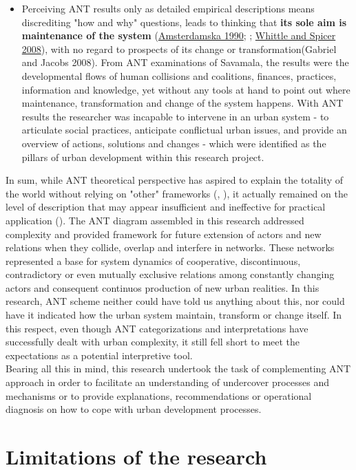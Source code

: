 \documentclass[11pt]{report}
\begin{document}
{\begin{itemize}
\item Perceiving ANT results only as detailed empirical descriptions means discrediting "how and why" questions, leads to thinking that \textbf{its sole aim is maintenance of the system} (\href{}{Amsterdamska 1990}; \cite{Lee and Brown 1994}; \href{}{Whittle and Spicer 2008}), with no regard to prospects of its change or transformation(Gabriel and Jacobs 2008).
From ANT examinations of Savamala, the results were the developmental flows of human collisions and coalitions, finances, practices, information and knowledge, yet without any tools at hand to point out where maintenance, transformation and change of the system happens.
With ANT results the researcher was incapable to intervene in an urban system - to articulate social practices, anticipate conflictual urban issues, and provide an overview of actions, solutions and changes - which were identified as the pillars of urban development within this research project.
\end{itemize}
 
In sum, while ANT theoretical perspective has aspired to explain the totality of the world without relying on "other" frameworks (\cite{Lee and Brown 1994},  \cite{Gad and Jensen 2010}), it actually remained on the level of description that may appear insufficient and ineffective for practical application (\cite{Gabriel and Jacobs 2008}).
The ANT diagram assembled in this research addressed complexity and provided framework for future extension of actors and new relations when they collide, overlap and interfere in networks.
These networks represented a base for system dynamics of cooperative, discontinuous, contradictory or even mutually exclusive relations among constantly changing actors and consequent continuos production of new urban realities.
In this research, ANT scheme neither could have told us anything about this, nor could have it indicated how the urban system maintain, transform or change itself. In this respect, even though ANT categorizations and interpretations have successfully dealt with urban complexity, it still fell short to meet the expectations as a potential interpretive tool.
\\
Bearing all this in mind, this research undertook the task of complementing ANT approach in order to facilitate an understanding of undercover processes and mechanisms or to provide explanations, recommendations or operational diagnosis on how to cope with urban development processes.

\section{Limitations of the research}

}
\end{document}
